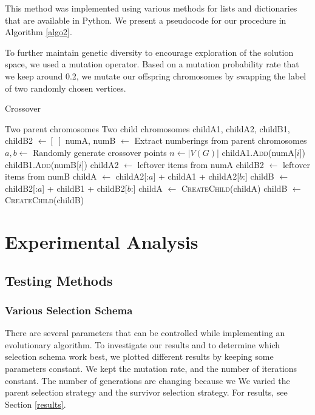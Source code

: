 \documentclass[conference,compsoc]{IEEEtran}
\begin{document}
This method was implemented using various methods for lists and 
dictionaries that are available in 
Python. We present a pseudocode for our procedure in Algorithm \ref{algo2}.

To further maintain genetic diversity to encourage exploration of the solution space, 
we used a mutation operator. Based on a mutation probability rate that we keep 
around 0.2, we mutate our offspring chromosomes by swapping the label of two 
randomly chosen vertices. 

\begin{algorithm}
  \caption{Crossover}
  \label{algo2}
  \begin{algorithmic}[1]
    \renewcommand{\algorithmicrequire}{\textbf{Input:}}
    \renewcommand{\algorithmicensure}{\textbf{Output:}}
    \REQUIRE Two parent chromosomes
    \ENSURE Two child chromosomes
    \STATE childA1, childA2, childB1, childB2 $\leftarrow [\;]$
    \STATE numA, numB $\leftarrow$ Extract numberings from parent chromosomes
    \STATE $a, b \leftarrow $ Randomly generate crossover points 
    \STATE $n \leftarrow |V(G)|$
    \STATE childA1.\textsc{Add}(numA[$i$])
    \STATE childB1.\textsc{Add}(numB[$i$])  
    \ENDFOR 
    \STATE childA2 $\leftarrow$ leftover items from numA 
    \STATE childB2 $\leftarrow$ leftover items from numB
    \STATE childA $\leftarrow$ childA2[:$a$] + childA1 + childA2[$b$:]  
    \STATE childB $\leftarrow$ childB2[:$a$] + childB1 + childB2[$b$:]
    \STATE childA $\leftarrow$ \textsc{CreateChild}(childA)
    \STATE childB $\leftarrow$ \textsc{CreateChild}(childB)
  \end{algorithmic}
\end{algorithm}


\section{Experimental Analysis}
\subsection{Testing Methods}
\subsubsection{Various Selection Schema} There are several parameters that can be 
controlled while implementing an evolutionary algorithm. 
To investigate our results and to determine which selection schema work best, 
we plotted different results by keeping some parameters constant. We kept the mutation rate, 
and the number of iterations constant. The number of generations are changing because we  We varied the parent selection strategy and the 
survivor selection strategy. For results, see Section \ref{results}.
\end{document}
